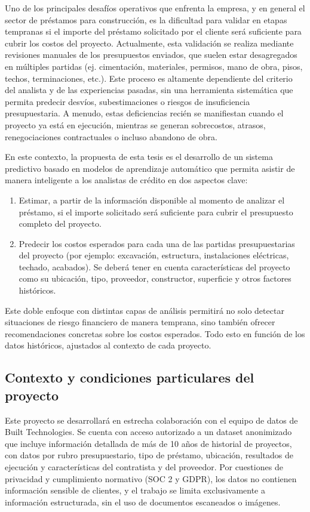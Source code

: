 \documentclass[
11pt, %
]{charter}
\begin{document}
Uno de los principales desafíos operativos que enfrenta la empresa, y en general el sector de préstamos para construcción, es la dificultad para validar en etapas tempranas si el importe del préstamo solicitado por el cliente será suficiente para cubrir los costos del proyecto. Actualmente, esta validación se realiza mediante revisiones manuales de los presupuestos enviados, que suelen estar desagregados en múltiples partidas (ej. cimentación, materiales, permisos, mano de obra, pisos, techos, terminaciones, etc.). Este proceso es altamente dependiente del criterio del analista y de las experiencias pasadas, sin una herramienta sistemática que permita predecir desvíos, subestimaciones o riesgos de insuficiencia presupuestaria. A menudo, estas deficiencias recién se manifiestan cuando el proyecto ya está en ejecución, mientras se generan sobrecostos, atrasos, renegociaciones contractuales o incluso abandono de obra.

En este contexto, la propuesta de esta tesis es el desarrollo de un sistema predictivo basado en modelos de aprendizaje automático que permita asistir de manera inteligente a los analistas de crédito en dos aspectos clave:

\begin{enumerate}
    \item Estimar, a partir de la información disponible al momento de analizar el préstamo, si el importe solicitado será suficiente para cubrir el presupuesto completo del proyecto.
    \item Predecir los costos esperados para cada una de las partidas presupuestarias del proyecto (por ejemplo: excavación, estructura, instalaciones eléctricas, techado, acabados). Se deberá tener en cuenta características del proyecto como su ubicación, tipo, proveedor, constructor, superficie y otros factores históricos.
\end{enumerate}

Este doble enfoque con distintas capas de análisis permitirá no solo detectar situaciones de riesgo financiero de manera temprana, sino también ofrecer recomendaciones concretas sobre los costos esperados. Todo esto en función de los datos históricos, ajustados al contexto de cada proyecto.

\subsection*{Contexto y condiciones particulares del proyecto}

Este proyecto se desarrollará en estrecha colaboración con el equipo de datos de Built Technologies. Se cuenta con acceso autorizado a un dataset anonimizado que incluye información detallada de más de 10 años de historial de proyectos, con datos por rubro presupuestario, tipo de préstamo, ubicación, resultados de ejecución y características del contratista y del proveedor. Por cuestiones de privacidad y cumplimiento normativo (SOC 2 y GDPR), los datos no contienen información sensible de clientes, y el trabajo se limita exclusivamente a información estructurada, sin el uso de documentos escaneados o imágenes.
\end{document}
